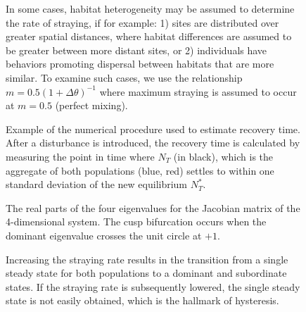 \documentclass{revtex4}
\newcommand{\beginsupplement}{%
        \clearpage
        \setcounter{table}{0}
        \renewcommand{\thetable}{S\arabic{table}}%
        \setcounter{figure}{0}
        \renewcommand{\thefigure}{S\arabic{figure}}%
     }
\begin{document}

\beginsupplement


\begin{figure}
  \captionsetup{justification=raggedright,
singlelinecheck=false
}
\centering
\caption{
In some cases, habitat heterogeneity may be assumed to determine the rate of straying, if for example:
1) sites are distributed over greater spatial distances, where habitat differences are assumed to be greater between more distant sites, or 2) individuals have behaviors promoting dispersal between habitats that are more similar. To examine such cases, we use the relationship $m= 0.5(1 + \Delta\theta)^{-1}$ where maximum straying is assumed to occur at $m=0.5$ (perfect mixing).
} \label{fig:mthetarelation}
\end{figure}


\begin{figure}
  \captionsetup{justification=raggedright,
singlelinecheck=false
}
\centering
\caption{
Example of the numerical procedure used to estimate recovery time. After a disturbance is introduced, the recovery time is calculated by measuring the point in time where $N_T$ (in black), which is the aggregate of both populations (blue, red) settles to within one standard deviation of the new equilibrium $N_T^*$. 
} \label{fig:recovery}
\end{figure}


\begin{figure}
  \captionsetup{justification=raggedright,
singlelinecheck=false
}
\centering
\caption{
The real parts of the four eigenvalues for the Jacobian matrix of the 4-dimensional system.
The cusp bifurcation occurs when the dominant eigenvalue crosses the unit circle at $+1$. 
} \label{fig:eigs}
\end{figure}


\begin{figure}
  \captionsetup{justification=raggedright,
singlelinecheck=false
}
\centering
\caption{
Increasing the straying rate results in the transition from a single steady state for both populations to a dominant and subordinate states. If the straying rate is subsequently lowered, the single steady state is not easily obtained, which is the hallmark of hysteresis.
} \label{fig:hysteresis}
\end{figure}
\end{document}
